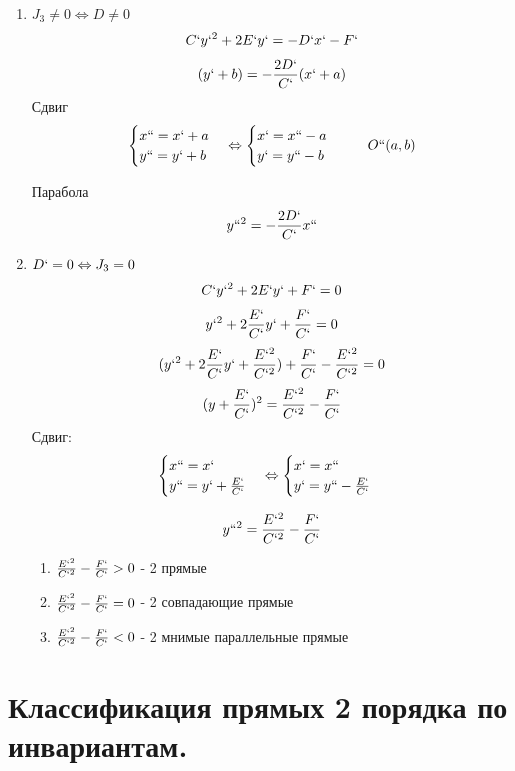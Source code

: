 \documentclass[12pt, a4paper]{article}
\begin{document}
\begin{enumerate}
	\item $J_3 \not = 0 \Leftrightarrow D \not = 0$
\[ C` y` ^2 + 2E` y` = -D` x` -F` \]
\[ (y` + b) = -\frac{2D`}{C`} (x` + a) \]
Сдвиг
\[ \begin{cases}
	x`` = x` + a\\
	y`` = y` + b
\end{cases} \Leftrightarrow \begin{cases}
	x` = x`` - a\\
	y` = y`` - b 
\end{cases} \;\;\;\;\;\; O``(a, b) \]
\begin{tcolorbox}
	Парабола
	\[ y``^2 = -\frac{2D`}{C`}x`` \]
\end{tcolorbox}
	\item $D` = 0 \Leftrightarrow J_3 = 0$\\
		\[ C`y`^2 + 2E` y` + F` =0 \]
		\[ y`^2 +2 \frac{E`}{C`}y` + \frac{F`}{C`} = 0 \]
		\[ (y`^2 +2 \frac{E`}{C`}y` + \frac{E`^2}{C`^2}) + \frac{F`}{C`} - \frac{E`^2}{C`^2} = 0 \]
		\[ (y + \frac{E`}{C`})^2 = \frac{E`^2}{C`^2} - \frac{F`}{C`} \]
		Сдвиг:\\
		\[ 
			\begin{cases}
				x`` = x` \\
				y`` = y` + \frac{E`}{C`}
				
			\end{cases} \Leftrightarrow 
			\begin{cases}
				x` = x``\\
				y` = y`` - \frac{E`}{C`}
			\end{cases}
		\]
		\begin{tcolorbox}
			\[y``^2 = \frac{E`^2}{C`^2} - \frac{F`}{C`} \]
			\begin{enumerate}
				\item $ \frac{E`^2}{C`^2} - \frac{F`}{C`} > 0 $ - 2 прямые
				\item $ \frac{E`^2}{C`^2} - \frac{F`}{C`} = 0 $ - 2 совпадающие прямые
				\item $ \frac{E`^2}{C`^2} - \frac{F`}{C`} < 0 $ - 2 мнимые параллельные прямые
			\end{enumerate}
		\end{tcolorbox}
\end{enumerate}
\section{Классификация прямых 2 порядка по инвариантам.}
\end{document}
